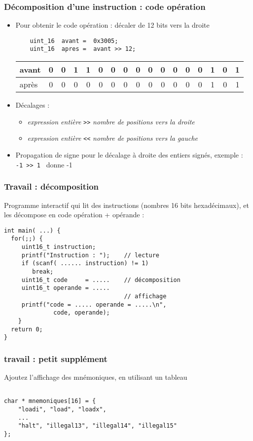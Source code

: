 \documentclass[]{beamer}
\begin{document}
\begin{frame}[containsverbatim]
\frametitle{Décomposition d'une instruction : code opération}

\begin{itemize}
\item Pour obtenir le \alert{code opération} : décaler de 12 bits vers la droite
\begin{lstlisting}
    uint_16  avant =  0x3005;
    uint_16  apres =  avant >> 12;
\end{lstlisting}
\begin{tabular}{l|*{16}{c|}}
\hline
avant & \alert{0} & \alert{0} & \alert{1} & \alert{1} &
0 & 0 & 0 & 0 &
0 & 0&  0&  0&
0 & 1 & 0 & 1 \\
\hline
après & 
0 & 0 & 0 & 0 &
0 & 0 & 0 & 0 &
0 & 0 & 0 & 0 &
\alert{0} & \alert{1} & \alert{0} & \alert{1} \\
\hline
\end{tabular}
\item \alert{Décalages} :  \begin{itemize}
\item \emph{expression entière} \verb+>>+ \emph{nombre de positions vers la droite}
\item \emph{expression entière} \verb+<<+ \emph{nombre de positions vers la gauche}
\end{itemize}
\item \alert{Propagation de signe} pour le décalage à droite des
\alert{entiers signés}, exemple : 
\verb+  -1 >> 1 + donne  -1 
\end{itemize}
\end{frame}


\begin{frame}[containsverbatim]
\frametitle{Travail : décomposition}
Programme interactif qui lit des instructions  (nombres 16 bits hexadécimaux), et les décompose
en code opération + opérande :
\begin{lstlisting}[style=sourcec]
int main( ...) {
  for(;;) {
     uint16_t instruction;
     printf("Instruction : ");    // lecture
     if (scanf( ...... instruction) != 1) 
        break;
     uint16_t code     = .....    // décomposition
     uint16_t operande = .....
                                  // affichage
     printf("code = ..... operande = .....\n", 
              code, operande);
    }
  return 0;
}
\end{lstlisting}
\end{frame}

\begin{frame}[containsverbatim]
\frametitle{travail : petit supplément}
Ajoutez l'affichage des mnémoniques, en utilisant un tableau
\begin{lstlisting}[style=sourcec]

char * mnemoniques[16] = {
    "loadi", "load", "loadx",
    ...
    "halt", "illegal13", "illegal14", "illegal15"
};
\end{lstlisting}

\end{frame}
\end{document}
